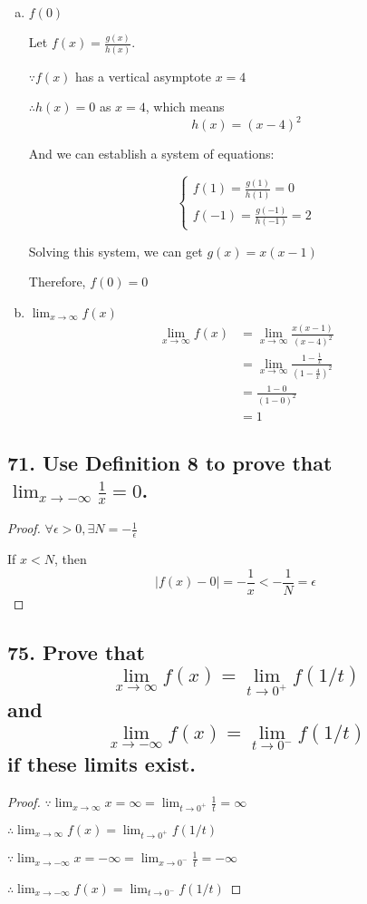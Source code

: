 \documentclass{article}
\begin{document}
    \begin{enumerate}[(a)]
        \item $f(0)$
        
        Let $f(x) = \frac{g(x)}{h(x)}$.

        $\because f(x)$ has a vertical asymptote $x = 4$

        $\therefore h(x) = 0$ as $ x = 4$, which means $$h(x) = (x - 4)^2$$

        And we can establish a system of equations:

        $$
        \begin{cases}
            f(1) = \frac{g(1)}{h(1)} = 0 \\
            f(-1) = \frac{g(-1)}{h(-1)} = 2
        \end{cases}
        $$

        Solving this system, we can get $g(x) = x(x - 1)$

        Therefore, $f(0) = 0$

        \item $\lim_{x \to \infty}f(x)$
        $$
        \begin{aligned}
            \lim_{x \to \infty}f(x) &= \lim_{x \to \infty}\frac{x(x - 1)}{(x - 4)^2} \\
            &= \lim_{x \to \infty}\frac{1 - \frac 1 x}{(1 - \frac 4 x) ^2} \\
            &= \frac{1 - 0}{(1 - 0)^2} \\
            &= 1
        \end{aligned}
        $$
    \end{enumerate}

    \subsection*{71. Use Definition 8 to prove that $\lim_{x \to -\infty}\frac 1 x = 0$.}

    \begin{proof}
        $\forall \epsilon > 0, \exists N = -\frac{1}{\epsilon}$

        If $x < N$, then $$|f(x) - 0| = -\frac 1 x  < -\frac 1 N = \epsilon$$


    \end{proof}


    \subsection*{75. Prove that $$\lim_{x \to \infty}f(x) = \lim_{t \to 0^+}f(1/t)$$ and $$\lim_{x \to -\infty}f(x) = \lim_{t  \to 0^-}f(1/t)$$ if these limits exist.}
     
    \begin{proof}
        $\because \lim_{x \to \infty}x = \infty =  \lim_{t \to 0^+}\frac 1 t = \infty$
        
        $\therefore \lim_{x \to \infty}f(x) = \lim_{t \to 0^+}f(1/t)$

        $\because \lim_{x \to -\infty}x = -\infty = \lim_{x \to 0^-}\frac 1 t = -\infty$
        
        $\therefore \lim_{x \to -\infty}f(x) = \lim_{t\to 0^-}f(1/t)$
        
    \end{proof}
\end{document}
